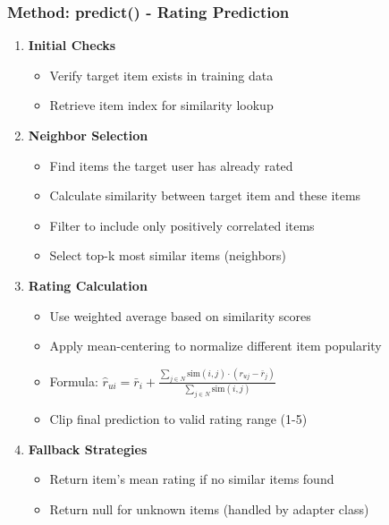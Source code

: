 \documentclass{beamer}
\begin{document}
\begin{frame}
\frametitle{Method: predict() - Rating Prediction}

\begin{enumerate}
    \item \textbf{Initial Checks}
    \begin{itemize}
        \item Verify target item exists in training data
        \item Retrieve item index for similarity lookup
    \end{itemize}
    
    \item \textbf{Neighbor Selection}
    \begin{itemize}
        \item Find items the target user has already rated
        \item Calculate similarity between target item and these items
        \item Filter to include only positively correlated items
        \item Select top-k most similar items (neighbors)
    \end{itemize}
    
    \item \textbf{Rating Calculation}
    \begin{itemize}
        \item Use weighted average based on similarity scores
        \item Apply mean-centering to normalize different item popularity
        \item Formula: $\hat{r}_{ui} = \bar{r}_i + \frac{\sum_{j \in N} \text{sim}(i,j) \cdot (r_{uj} - \bar{r}_j)}{\sum_{j \in N} \text{sim}(i,j)}$
        \item Clip final prediction to valid rating range (1-5)
    \end{itemize}
    
    \item \textbf{Fallback Strategies}
    \begin{itemize}
        \item Return item's mean rating if no similar items found
        \item Return null for unknown items (handled by adapter class)
    \end{itemize}
\end{enumerate}
\end{frame}
\end{document}

